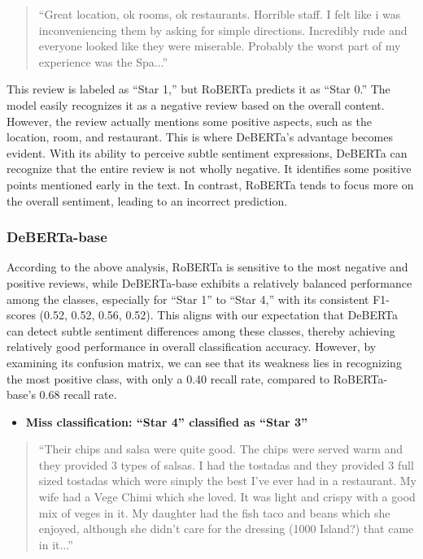 \documentclass[11pt]{article}
\begin{document}
\begin{quote}“Great location, ok rooms, ok restaurants. Horrible staff. I felt like i was inconveniencing them by asking for simple directions. Incredibly rude and everyone looked like they were miserable. Probably the worst part of my experience was the Spa...”
\end{quote}

This review is labeled as “Star 1,” but RoBERTa predicts it as “Star 0.” The model easily recognizes it as a negative review based on the overall content. However, the review actually mentions some positive aspects, such as the location, room, and restaurant. This is where DeBERTa's advantage becomes evident. With its ability to perceive subtle sentiment expressions, DeBERTa can recognize that the entire review is not wholly negative. It identifies some positive points mentioned early in the text. In contrast, RoBERTa tends to focus more on the overall sentiment, leading to an incorrect prediction.

\subsubsection{DeBERTa-base}
According to the above analysis, RoBERTa is sensitive to the most negative and positive reviews, while DeBERTa-base exhibits a relatively balanced performance among the classes, especially for “Star 1” to “Star 4,” with its consistent F1-scores (0.52, 0.52, 0.56, 0.52). This aligns with our expectation that DeBERTa can detect subtle sentiment differences among these classes, thereby achieving relatively good performance in overall classification accuracy. However, by examining its confusion matrix, we can see that its weakness lies in recognizing the most positive class, with only a 0.40 recall rate, compared to RoBERTa-base's 0.68 recall rate.

\begin{itemize}
  \item \textbf{Miss classification: “Star 4” classified as “Star 3”}
\end{itemize}

\begin{quote}“Their chips and salsa were quite good. The chips were served warm and they provided 3 types of salsas. I had the tostadas and they provided 3 full sized tostadas which were simply the best I've ever had in a restaurant.  My wife had a Vege Chimi which she loved.  It was light and crispy with a good mix of veges in it.  My daughter had the fish taco and beans which she enjoyed, although she didn't care for the dressing (1000 Island?) that came in it...”
\end{quote}
\end{document}
